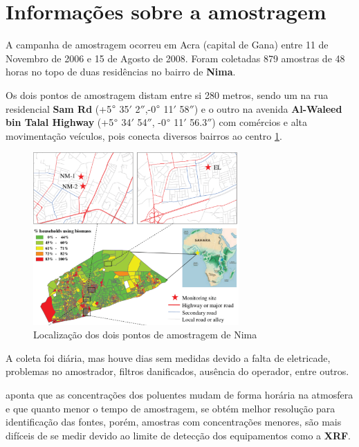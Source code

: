 \section{Informações sobre a amostragem}


A campanha de amostragem ocorreu em Acra (capital de Gana) 
entre 11 de Novembro de 2006 e 15 de Agosto de 2008. 
Foram coletadas 879 amostras de 48 horas no topo de duas residências 
no bairro de \textbf{Nima}.

Os dois pontos de amostragem distam entre si 280 metros, sendo um na
rua residencial \textbf{Sam Rd} (+5$\degree$ 35$'$ 2$''$,-0$\degree$ 11$'$ 58$''$)
e o outro na avenida \textbf{Al-Waleed bin Talal Highway} 
(+5$\degree$ 34$'$ 54$''$, -0$\degree$ 11$'$ 56.3$''$) com comércios e
alta movimentação veículos, pois conecta diversos bairros ao centro
\ref{fig:nima}. 

\begin{figure}[H]
\begin{center}
  \includegraphics[width=0.7\textwidth]{../inputs/images/zheng/nima_mapa.pdf}
  \caption{Localização dos dois pontos de amostragem de Nima \label{fig:nima}}
\end{center}
\end{figure}

A coleta foi diária, mas houve dias sem medidas devido a falta de eletricade,
problemas no amostrador, filtros danificados, ausência do operador, entre outros. 

\cite{calzolai2015} aponta que as concentrações dos poluentes mudam de 
forma horária na atmosfera e que quanto menor o tempo de amostragem,
se obtém melhor resolução para identificação das fontes, 
porém, amostras com concentrações menores, são mais difíceis de se medir
devido ao limite de detecção dos equipamentos como a \textbf{XRF}. 

